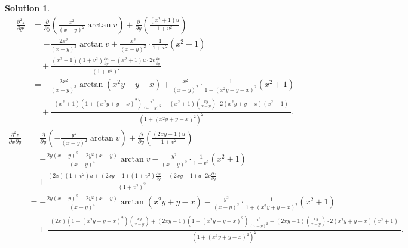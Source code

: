 \documentclass[a4paper,12pt]{article}
\newtheorem*{sol}{Solution}
\begin{document}
\begin{sol}
    \begin{align*}
        \frac{\partial^2 z}{\partial y^2}
         & = \frac{\partial}{\partial y}\left(\frac{x^2}{(x-y)^2}\arctan v\right)
        + \frac{\partial}{\partial y}\left(\frac{(x^2+1)u}{1+v^2}\right)                                                                                             \\
         & = -\frac{2x^2}{(x-y)^3}\arctan v
        + \frac{x^2}{(x-y)^2}\cdot\frac{1}{1+v^2}(x^2+1)                                                                                                             \\
         & \quad + \frac{(x^2+1)(1+v^2)\frac{\partial u}{\partial y} - (x^2+1)u\cdot 2v\frac{\partial v}{\partial y}}{(1+v^2)^2}                                     \\
         & = -\frac{2x^2}{(x-y)^3}\arctan (x^2y + y - x)
        + \frac{x^2}{(x-y)^2}\cdot\frac{1}{1+(x^2y + y - x)^2}(x^2+1)                                                                                                \\
         & \quad + \frac{\substack{(x^2+1)(1+(x^2y + y - x)^2)\frac{x^2}{(x-y)^2} - (x^2+1)(\frac{xy}{x-y})\cdot 2(x^2y + y - x)(x^2 + 1)}}{(1+(x^2y + y - x)^2)^2}.
    \end{align*}
    \begin{align*}
        \frac{\partial^2 z}{\partial x\partial y}
         & = \frac{\partial}{\partial y}\left(-\frac{y^2}{(x-y)^2}\arctan v\right)
        + \frac{\partial}{\partial y}\left(\frac{(2xy-1)u}{1+v^2}\right)                                                                                                                                        \\
         & = -\frac{2y(x-y)^2 + 2y^2(x-y)}{(x-y)^4}\arctan v
        - \frac{y^2}{(x-y)^2}\cdot\frac{1}{1+v^2}(x^2+1)                                                                                                                                                        \\
         & \quad + \frac{(2x)(1+v^2)u + (2xy-1)(1+v^2)\frac{\partial u}{\partial y} - (2xy-1)u\cdot 2v\frac{\partial v}{\partial y}}{(1+v^2)^2}                                                                 \\
         & = -\frac{2y(x-y)^2 + 2y^2(x-y)}{(x-y)^4}\arctan (x^2y + y - x)
        - \frac{y^2}{(x-y)^2}\cdot\frac{1}{1+(x^2y + y - x)^2}(x^2+1)                                                                                                                                           \\
         & \quad + \frac{\substack{(2x)(1+(x^2y + y - x)^2)(\frac{xy}{x-y}) + (2xy-1)(1+(x^2y + y - x)^2)\frac{x^2}{(x-y)^2} - (2xy-1)(\frac{xy}{x-y})\cdot 2(x^2y + y - x)(x^2 + 1)}}{(1+(x^2y + y - x)^2)^2}.
    \end{align*}
\end{sol}
\end{document}
